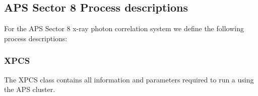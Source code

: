 




\subsection{APS Sector 8 Process descriptions}
For the APS Sector 8 x-ray photon correlation system we define the following process descriptions:

\newpage
\subsubsection{XPCS}
\label{table:xpcs}

The XPCS class contains all information and parameters required to run a  using the APS cluster.


